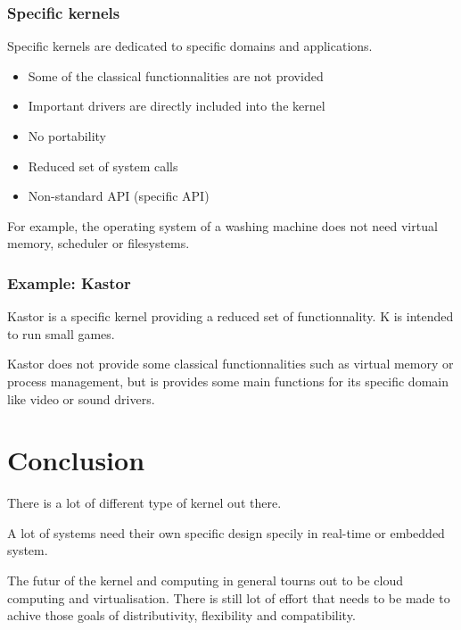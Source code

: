 %
%

\begin{frame}
  \frametitle{Specific kernels}

  Specific kernels are dedicated to specific domains and applications.

  \begin{itemize}
  \item
    Some of the classical functionnalities are not provided
  \item
    Important drivers are directly included into the kernel
  \item
    No portability
  \item
    Reduced set of system calls
  \item
    Non-standard API (specific API)
  \end{itemize}

  \-

  For example, the operating system of a washing machine does not need
  virtual memory, scheduler or filesystems.

\end{frame}

%
%

\begin{frame}
  \frametitle{Example: Kastor}

  Kastor is a specific kernel providing a reduced set of functionnality. K
  is intended to run small games.

  \begin{center}
  \end{center}

  Kastor does not provide some classical functionnalities such as virtual
  memory or process management, but is provides some main functions
  for its specific domain like video or sound drivers.

\end{frame}

\section{Conclusion}
\begin{frame}
        There is a lot of different type of kernel out there.

        \-

        A lot of systems need their own specific design specily in
        real-time or embedded system.

        \-

        The futur of the kernel and computing in general tourns out to
        be cloud computing and virtualisation.
        There is still lot of effort that needs to be
        made to achive those goals of distributivity,
        flexibility and compatibility.
\end{frame}


